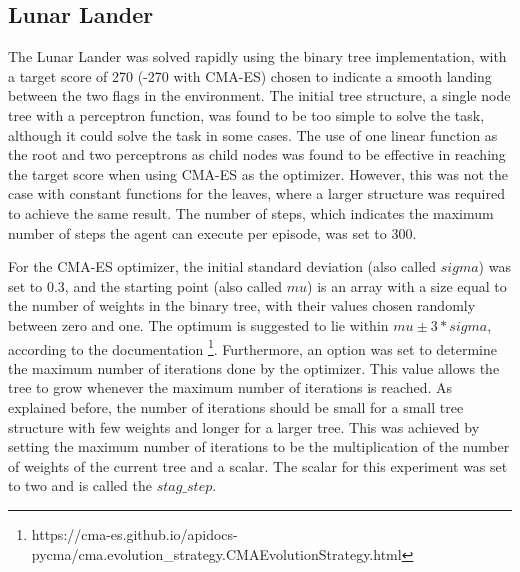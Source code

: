 \subsection{Lunar Lander}
\label{lunar_lander}
The Lunar Lander was solved rapidly using the binary tree implementation, with a target score of 270 (-270 with CMA-ES) chosen to indicate a smooth landing between the two flags in the environment. The initial tree structure, a single node tree with a perceptron function, was found to be too simple to solve the task, although it could solve the task in some cases. The use of one linear function as the root and two perceptrons as child nodes was found to be effective in reaching the target score when using CMA-ES as the optimizer. However, this was not the case with constant functions for the leaves, where a larger structure was required to achieve the same result. The number of steps, which indicates the maximum number of steps the agent can execute per episode, was set to 300.

For the CMA-ES optimizer, the initial standard deviation (also called $sigma$) was set to 0.3, and the starting point (also called $mu$) is an array with a size equal to the number of weights in the binary tree, with their values chosen randomly between zero and one. The optimum is suggested to lie within $mu \pm 3*sigma$, according to the documentation \footnote{https://cma-es.github.io/apidocs-pycma/cma.evolution\_strategy.CMAEvolutionStrategy.html}. Furthermore, an option was set to determine the maximum number of iterations done by the optimizer. This value allows the tree to grow whenever the maximum number of iterations is reached. As explained before, the number of iterations should be small for a small tree structure with few weights and longer for a larger tree. This was achieved by setting the maximum number of iterations to be the multiplication of the number of weights of the current tree and a scalar. The scalar for this experiment was set to two and is called the $stag\_step$.


